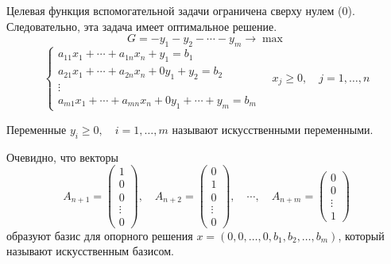 \documentclass[17pt]{extarticle}
\begin{document}
Целевая функция вспомогательной задачи ограничена сверху нулем (0). Следовательно, эта задача имеет оптимальное решение.
\[
    G = -y_1 - y_2 - \cdots - y_m \rightarrow \max
\]
\[
    \begin{cases}
        a_{11}x_1 + \cdots + a_{1n}x_n + y_1 = b_1        \\
        a_{21}x_1 + \cdots + a_{2n}x_n + 0y_1 + y_2 = b_2 \\
        \vdots                                            \\
        a_{m1}x_1 + \cdots + a_{mn}x_n + 0y_1 + \cdots + y_m = b_m
    \end{cases} \quad x_j \geq 0, \quad j = 1, \ldots, n
\]

Переменные $y_i \geq 0, \quad i = 1, \ldots, m$ называют искусственными переменными.

Очевидно, что векторы
\[
    A_{n+1} = \begin{pmatrix} 1 \\ 0 \\ 0 \\ \vdots \\ 0 \end{pmatrix}, \quad
    A_{n+2} = \begin{pmatrix} 0 \\ 1 \\ 0 \\ \vdots \\ 0 \end{pmatrix}, \quad
    \cdots, \quad
    A_{n+m} = \begin{pmatrix} 0 \\ 0 \\ \vdots \\ 1 \end{pmatrix}
\]
образуют базис для опорного решения \( x = (0, 0, \ldots, 0, b_1, b_2, \ldots, b_m) \), который называют искусственным базисом.
\end{document}
